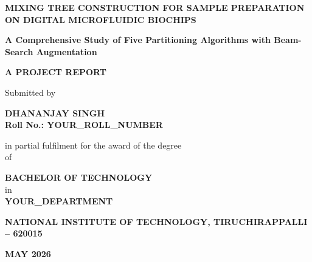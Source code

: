\begin{titlepage}
\begin{center}

\vspace*{1cm}

\textbf{\Large MIXING TREE CONSTRUCTION FOR SAMPLE PREPARATION ON DIGITAL MICROFLUIDIC BIOCHIPS}

\vspace{0.5cm}
\textbf{\large A Comprehensive Study of Five Partitioning Algorithms with Beam-Search Augmentation}

\vspace{1.5cm}

\textbf{A PROJECT REPORT}

\vspace{0.3cm}

Submitted by

\vspace{0.5cm}

\textbf{DHANANJAY SINGH} \\
\textbf{Roll No.: YOUR\_ROLL\_NUMBER}

\vspace{1.5cm}

in partial fulfilment for the award of the degree \\
of

\vspace{0.5cm}

\textbf{BACHELOR OF TECHNOLOGY} \\
in \\
\textbf{YOUR\_DEPARTMENT}

\vspace{1.5cm}

\begin{figure}[H]
\centering
\end{figure}

\vspace{0.5cm}

\textbf{NATIONAL INSTITUTE OF TECHNOLOGY, TIRUCHIRAPPALLI -- 620015}

\vspace{0.5cm}

\textbf{MAY 2026}

\end{center}
\end{titlepage}
